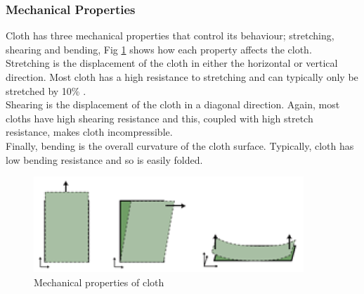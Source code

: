 \subsubsection{Mechanical Properties}
Cloth has three mechanical properties that control its behaviour; stretching, shearing and bending, Fig \ref{fig:mechanical properties} shows how each property affects the cloth.
\\Stretching is the displacement of the cloth in either the horizontal or vertical direction. Most cloth has a high resistance to stretching and can typically only be stretched by 10\% \parencites{Yalcn}{Provot2001}.
\\Shearing is the displacement of the cloth in a diagonal direction. Again, most cloths have high shearing resistance and this, coupled with high stretch resistance, makes cloth incompressible.
\\Finally, bending is the overall curvature of the cloth surface. Typically, cloth has low bending resistance and so is easily folded.
\begin{figure}[tp]
   \begin{center}
     \includegraphics{Figures/mechanical_properties}
   \end{center}
   \caption[Mechanical properties of cloth]{Mechanical properties of cloth \parencite[1]{Yalcn}}
   \label{fig:mechanical properties}
\end{figure}

